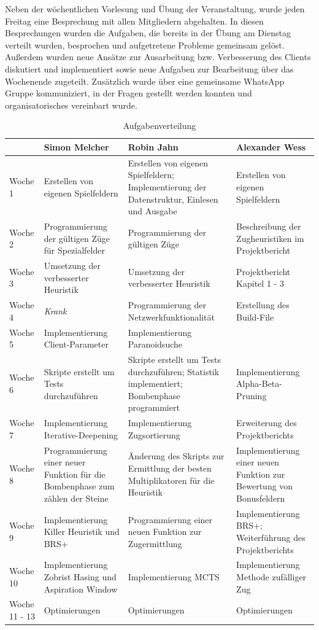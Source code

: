 \documentclass[12pt,a4paper,bibliography=totocnumbered,listof=totocnumbered]{article}
\begin{document}
Neben der wöchentlichen Vorlesung und Übung der Veranstaltung, wurde jeden Freitag eine Besprechung mit allen Mitgliedern abgehalten. In diesen Besprechungen wurden die Aufgaben, die bereits in der Übung am Dienstag verteilt wurden, besprochen und aufgetretene Probleme gemeinsam gelöst. Außerdem wurden neue Ansätze zur Ausarbeitung bzw. Verbesserung des Clients diskutiert und implementiert sowie neue Aufgaben zur Bearbeitung über das Wochenende zugeteilt. Zusätzlich wurde über eine gemeinsame WhatsApp Gruppe kommuniziert, in der Fragen gestellt werden konnten und organisatorisches vereinbart wurde.

\vspace{1em}
\begin{table}[H]
\centering
	\begin{tabular} {| m{2.6cm} | m{4cm} | m{4cm} | m{4cm}|}
		\hline
		\textbf{} &\textbf{Simon Melcher} & \textbf{Robin Jahn} & \textbf{Alexander Wess}\\
		\hline
		Woche 1 & Erstellen von eigenen Spielfeldern & Erstellen von eigenen Spielfeldern; Implementierung der Datenstruktur, Einlesen und Ausgabe & Erstellen von eigenen Spielfeldern\\
		\hline
		Woche 2 & Programmierung der gültigen Züge für Spezialfelder & Programmierung der gültigen Züge & Beschreibung der Zugheuristiken im Projektbericht\\
		\hline
		Woche 3 & Umsetzung der verbesserter Heuristik & Umsetzung der verbesserter Heuristik & Projektbericht Kapitel 1 - 3\\
		\hline
		Woche 4 & \textit{Krank} & Programmierung der Netzwerkfunktionalität & Erstellung des Build-File\\
		\hline
		Woche 5 & Implementierung Client-Parameter & Implementierung Paranoidsuche &\\
		\hline
		Woche 6 & Skripte erstellt um Tests durchzuführen & Skripte erstellt um Tests durchzuführen; Statistik implementiert; Bombenphase programmiert & Implementierung Alpha-Beta-Pruning\\
		\hline
		Woche 7 & Implementierung Iterative-Deepening & Implementierung Zugsortierung & Erweiterung des Projektberichts\\
		\hline
		Woche 8 & Programmierung einer neuer Funktion für die Bombenphase zum zählen der Steine & Änderung des Skripts zur Ermittlung der besten Multiplikatoren für die Heuristik & Implementierung einer neuen Funktion zur Bewertung von Bonusfeldern\\
		\hline
		Woche 9 & Implementierung Killer Heuristik und BRS+ & Programmierung einer neuen Funktion zur Zugermittlung & Implementierung BRS+; Weiterführung des Projektberichts\\
		\hline
		Woche 10 & Implementierung Zobrist Hasing und Aspiration Window & Implementierung MCTS & Implementierung Methode zufälliger Zug\\
		\hline
		Woche 11 - 13 & Optimierungen & Optimierungen & Optimierungen\\
		\hline
	\end{tabular}
	\caption{Aufgabenverteilung}
	\label{tab:tasks}
\end{table}
\newpage
\end{document}
